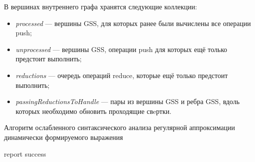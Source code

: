 В вершинах внутреннего графа хранятся следующие коллекции:
\begin{itemize}
  \item \emph{processed} --- вершины GSS, для которых ранее были вычислены все операции push;
  \item \emph{unprocessed} --- вершины GSS, операции push для которых ещё только предстоит выполнить;
  \item \emph{reductions} --- очередь операций reduce, которые ещё только предстоит выполнить;
  \item \emph{passingReductionsToHandle} --- пары из вершины GSS и ребра GSS, вдоль которых необходимо обновить проходящие свeртки.
\end{itemize}


\begin{algorithm}[H]
\begin{algorithmic}[1]
\caption{Алгоритм ослабленного синтаксического анализа регулярной аппроксимации динамически формируемого выражения}
\label{parsing}
    {report success}
    \EndIf
  \Else
    \EndWhile
    \EndIf
  \EndIf
\EndFunction
\end{algorithmic}
\end{algorithm}


